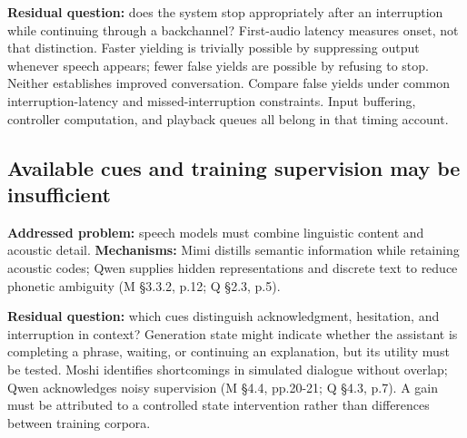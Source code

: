 \documentclass[11pt]{article}
\begin{document}
\textbf{Residual question:} does the system stop appropriately after an interruption while continuing through a backchannel? First-audio latency measures onset, not that distinction. Faster yielding is trivially possible by suppressing output whenever speech appears; fewer false yields are possible by refusing to stop. Neither establishes improved conversation. Compare false yields under common interruption-latency and missed-interruption constraints. Input buffering, controller computation, and playback queues all belong in that timing account.

\subsection{Available cues and training supervision may be insufficient}

\textbf{Addressed problem:} speech models must combine linguistic content and acoustic detail. \textbf{Mechanisms:} Mimi distills semantic information while retaining acoustic codes; Qwen supplies hidden representations and discrete text to reduce phonetic ambiguity (M §3.3.2, p.12; Q §2.3, p.5).

\textbf{Residual question:} which cues distinguish acknowledgment, hesitation, and interruption in context? Generation state might indicate whether the assistant is completing a phrase, waiting, or continuing an explanation, but its utility must be tested. Moshi identifies shortcomings in simulated dialogue without overlap; Qwen acknowledges noisy supervision (M §4.4, pp.20-21; Q §4.3, p.7). A gain must be attributed to a controlled state intervention rather than differences between training corpora.
\end{document}
